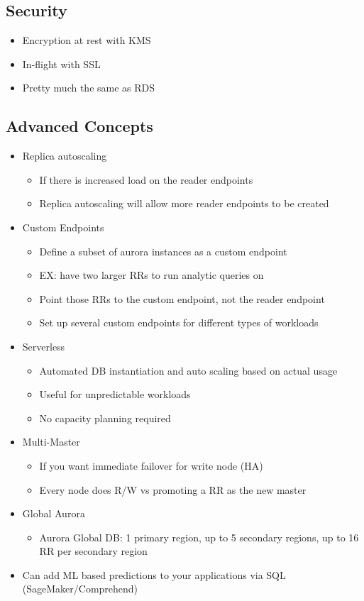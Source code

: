\documentclass[]{scrartcl}
\begin{document}
\subsection{Security}
\begin{itemize}
	\item Encryption at rest with KMS
	\item In-flight with SSL
	\item Pretty much the same as RDS
\end{itemize}

\subsection{Advanced Concepts}
\begin{itemize}
	\item Replica autoscaling
	\begin{itemize}
		\item If there is increased load on the reader endpoints
		\item Replica autoscaling will allow more reader endpoints to be created
	\end{itemize}
	\item Custom Endpoints
	\begin{itemize}
		\item Define a subset of aurora instances as a custom endpoint
		\item EX: have two larger RRs to run analytic queries on
		\item Point those RRs to the custom endpoint, not the reader endpoint
		\item Set up several custom endpoints for different types of workloads
	\end{itemize}
	\item Serverless
	\begin{itemize}
		\item Automated DB instantiation and auto scaling based on actual usage
		\item Useful for unpredictable workloads
		\item No capacity planning required
	\end{itemize}
	\item Multi-Master
	\begin{itemize}
		\item If you want immediate failover for write node (HA)
		\item Every node does R/W vs promoting a RR as the new master
	\end{itemize}
	\item Global Aurora
	\begin{itemize}
		\item Aurora Global DB: 1 primary region, up to 5 secondary regions, up to 16 RR per secondary region
	\end{itemize}
	\item Can add ML based predictions to your applications via SQL (SageMaker/Comprehend)
\end{itemize}
\end{document}
